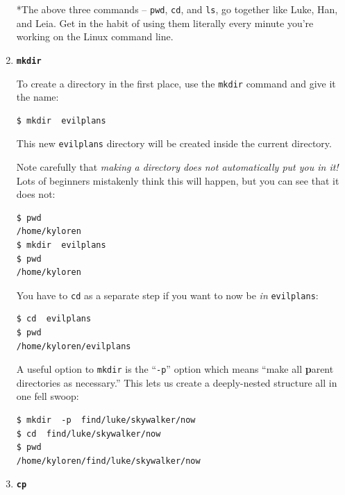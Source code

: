 \begin{enumerate}
\bigline
\vspace{.1in}
*The above three commands -- \texttt{pwd}, \texttt{cd}, and \texttt{ls}, go
together like Luke, Han, and Leia. Get in the habit of using them literally
every minute you're working on the Linux command line.
\vspace{.1in}
\bigline

\item \textbf{\texttt{mkdir}}

To create a directory in the first place, use the \texttt{mkdir} command and
give it the name:

\begin{Verbatim}[fontsize=\small]
$ mkdir  evilplans
\end{Verbatim}

This new \texttt{evilplans} directory will be created inside the current
directory.

Note carefully that \textit{making a directory does not automatically put you
in it!} Lots of beginners mistakenly think this will happen, but you can see
that it does not:

\begin{Verbatim}[fontsize=\small]
$ pwd
/home/kyloren
$ mkdir  evilplans
$ pwd
/home/kyloren
\end{Verbatim}

You have to \texttt{cd} as a separate step if you want to now be \textit{in}
\texttt{evilplans}:

\begin{Verbatim}[fontsize=\small]
$ cd  evilplans
$ pwd
/home/kyloren/evilplans
\end{Verbatim}

A useful option to \texttt{mkdir} is the ``\texttt{-p}'' option which means
``make all \textbf{p}arent directories as necessary.'' This lets us create a
deeply-nested structure all in one fell swoop:

\begin{Verbatim}[fontsize=\small]
$ mkdir  -p  find/luke/skywalker/now
$ cd  find/luke/skywalker/now
$ pwd
/home/kyloren/find/luke/skywalker/now
\end{Verbatim}

\bigline

\item \textbf{\texttt{cp}}


\end{enumerate}
